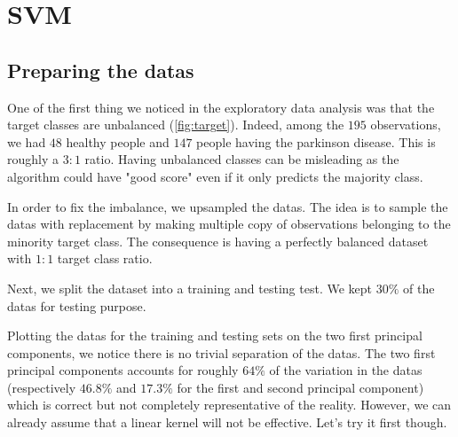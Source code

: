 \section{SVM}

\subsection[short]{Preparing the datas}

One of the first thing we noticed in the exploratory data analysis was that the target classes are unbalanced (\autoref{fig:target}). Indeed, among the $195$ observations, we had $48$ healthy people and $147$ people having the parkinson disease. This is roughly a $3:1$ ratio. Having unbalanced classes can be misleading as the algorithm could have "good score" even if it only predicts the majority class. 

In order to fix the imbalance, we upsampled the datas. The idea is to sample the datas with replacement by making multiple copy of observations belonging to the minority target class. The consequence is having a perfectly balanced dataset with $1:1$ target class ratio.

Next, we split the dataset into a training and testing test. We kept $30\%$ of the datas for testing purpose.


Plotting the datas for the training and testing sets on the two first principal components, we notice there is no trivial separation of the datas. The two first principal components accounts for roughly $64\%$ of the variation in the datas (respectively $46.8\%$ and $17.3\%$ for the first and second principal component) which is correct but not completely representative of the reality. However, we can already assume that a linear kernel will not be effective. Let's try it first though.

